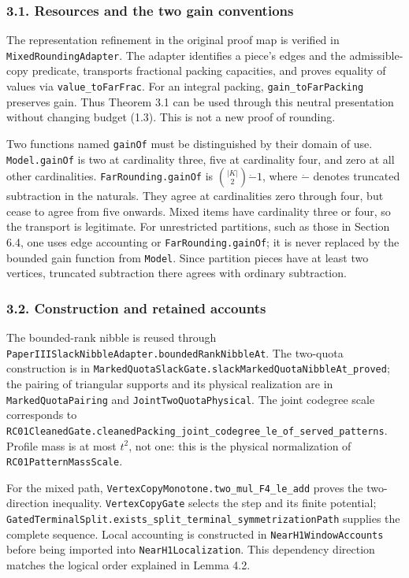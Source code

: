 \documentclass[english,11pt,a4paper]{article}
\begin{document}
\subsubsection{3.1. Resources and the two gain
conventions}\label{resources-and-the-two-gain-conventions}

The representation refinement in the original proof map is verified in
\nolinkurl{MixedRoundingAdapter}. The adapter identifies a piece's edges
and the admissible-copy predicate, transports fractional packing
capacities, and proves equality of values via \nolinkurl{value_toFarFrac}.
For an integral packing, \nolinkurl{gain_toFarPacking} preserves gain.
Thus Theorem 3.1 can be used through this neutral presentation without
changing budget (1.3). This is not a new proof of rounding.

Two functions named \nolinkurl{gainOf} must be distinguished by their
domain of use. \nolinkurl{Model.gainOf} is two at cardinality three, five
at cardinality four, and zero at all other cardinalities.
\nolinkurl{FarRounding.gainOf} is \(\binom{|K|}{2}\mathbin{\dot-}1\), where
\(\dot-\) denotes truncated subtraction in the naturals. They agree at
cardinalities zero through four, but cease to agree from five onwards.
Mixed items have cardinality three or four, so the transport is
legitimate. For unrestricted partitions, such as those in Section 6.4,
one uses edge accounting or \nolinkurl{FarRounding.gainOf}; it is never
replaced by the bounded gain function from \nolinkurl{Model}. Since
partition pieces have at least two vertices, truncated subtraction there
agrees with ordinary subtraction.

\subsubsection{3.2. Construction and retained
accounts}\label{construction-and-retained-accounts}

The bounded-rank nibble is reused through
\nolinkurl{PaperIIISlackNibbleAdapter.boundedRankNibbleAt}. The two-quota
construction is in
\nolinkurl{MarkedQuotaSlackGate.slackMarkedQuotaNibbleAt_proved}; the
pairing of triangular supports and its physical realization are in
\nolinkurl{MarkedQuotaPairing} and \nolinkurl{JointTwoQuotaPhysical}. The
joint codegree scale corresponds to
\nolinkurl{RC01CleanedGate.cleanedPacking_joint_codegree_le_of_served_patterns}.
Profile mass is at most \(t^2\), not one: this is the physical
normalization of \nolinkurl{RC01PatternMassScale}.

For the mixed path, \nolinkurl{VertexCopyMonotone.two_mul_F4_le_add}
proves the two-direction inequality. \nolinkurl{VertexCopyGate} selects the
step and its finite potential;
\nolinkurl{GatedTerminalSplit.exists_split_terminal_symmetrizationPath}
supplies the complete sequence. Local accounting is constructed in
\nolinkurl{NearH1WindowAccounts} before being imported into
\nolinkurl{NearH1Localization}. This dependency direction matches the
logical order explained in Lemma 4.2.
\end{document}

